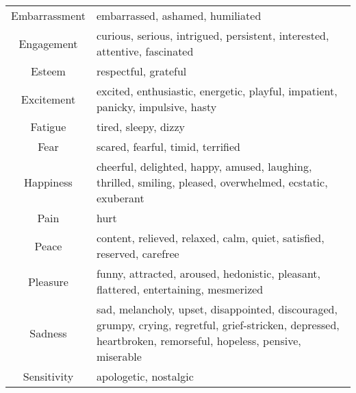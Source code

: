 \begin{table}[t]
\begin{tabular}{cp{6.2cm}}
Embarrassment & embarrassed, ashamed, humiliated                                                                                                                                      \\
Engagement    & curious, serious, intrigued, persistent, interested, attentive, fascinated                                                                                            \\
Esteem        & respectful, grateful                                                                                                                                                  \\
Excitement    & excited, enthusiastic, energetic, playful, impatient, panicky, impulsive, hasty                                                                                       \\
Fatigue       & tired, sleepy, dizzy                                                                                                                                                  \\
Fear          & scared, fearful, timid, terrified                                                                                                                                     \\
Happiness     & cheerful, delighted, happy, amused, laughing, thrilled, smiling, pleased, overwhelmed, ecstatic, exuberant                                                            \\
Pain          & hurt                                                                                                                                                                  \\
Peace         & content, relieved, relaxed, calm, quiet, satisfied, reserved, carefree                                                                                                \\
Pleasure      & funny, attracted, aroused, hedonistic, pleasant, flattered, entertaining, mesmerized                                                                                  \\
Sadness       & sad, melancholy, upset, disappointed, discouraged, grumpy, crying, regretful, grief-stricken, depressed, heartbroken, remorseful, hopeless, pensive, miserable        \\
Sensitivity   & apologetic, nostalgic                                                                                                                                                 \\

\end{tabular}
\end{table}
